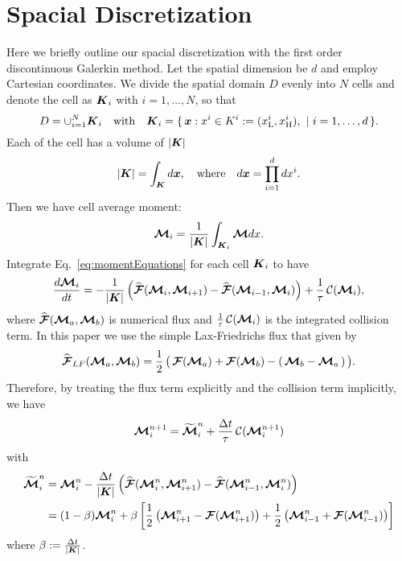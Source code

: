\section{Spacial Discretization}\label{se:SpacialDiscretization}
Here we briefly outline our spacial discretization with the first order discontinuous Galerkin method.
Let the spatial dimension be $d$ and employ Cartesian coordinates.
We divide the spatial domain $D$ evenly into $N$ cells and denote the cell as $\boldsymbol{K}_{i}$ with $i = 1,\ldots,N$, so that
\begin{equation*}
D = \cup_{i = 1}^{N} \boldsymbol{K}_{i} \quad \text{with} \quad
  \boldsymbol{K}_{i}=\{\,\boldsymbol{x} : x^{i} \in K^{i} := (x_{{\rm L}}^{i},x_{{\rm H}}^{i}),~|~i=1,\ldots,d\,\}.
\end{equation*}
Each of the cell has a volume of $|\boldsymbol{K}|$
\begin{equation*}
  |\boldsymbol{K}| = \int_{\boldsymbol{K}}d\boldsymbol{x}, \quad\text{where}\quad d\boldsymbol{x} = \prod_{i=1}^{d}dx^{i}.  
\end{equation*}
Then we have cell average moment:
\begin{equation}
\boldsymbol{\mathcal{M}}_{i} = \dfrac{1}{|\boldsymbol{K}|} \int_{\boldsymbol{K}_i}\boldsymbol{\mathcal{M}} dx.
\end{equation}
Integrate Eq.~\eqref{eq:momentEquations} for each cell $\boldsymbol{K}_{i}$ to have
\begin{equation}
\dfrac{d \boldsymbol{\mathcal{M}}_{i}}{d t} = - \dfrac{1}{|\boldsymbol{K}|} \left( \widehat{\boldsymbol{\mathcal{F}}}(\boldsymbol{\mathcal{M}}_{i},\boldsymbol{\mathcal{M}}_{i+1}) -  \widehat{\boldsymbol{\mathcal{F}}}(\boldsymbol{\mathcal{M}}_{i-1},\boldsymbol{\mathcal{M}}_{i})\right) + \frac{1}{\tau}\,\mathcal{C}(\boldsymbol{\mathcal{M}}_{i}),
\end{equation}
where $\widehat{\boldsymbol{\mathcal{F}}}(\boldsymbol{\mathcal{M}}_{a},\boldsymbol{\mathcal{M}}_{b})$ is numerical flux and $\frac{1}{\tau}\,\mathcal{C}(\boldsymbol{\mathcal{M}}_{i})$ is the integrated collision term.
In this paper we use the simple Lax-Friedrichs flux that given by
\begin{equation}
  \widehat{\boldsymbol{\mathcal{F}}}_{LF}(\boldsymbol{\mathcal{M}}_{a},\boldsymbol{\mathcal{M}}_{b})
  =\frac{1}{2}\,\big(\,\boldsymbol{\mathcal{F}}(\boldsymbol{\mathcal{M}}_{a})+\boldsymbol{\mathcal{F}}(\boldsymbol{\mathcal{M}}_{b})-(\,\boldsymbol{\mathcal{M}}_{b}-\boldsymbol{\mathcal{M}}_{a}\,)\,\big).
  \label{eq:Lax-Friedrichs flux}
\end{equation}
Therefore, by treating the flux term explicitly and the collision term implicitly, we have
\begin{align}
\boldsymbol{\mathcal{M}}_{i}^{n+1} = \widetilde{\boldsymbol{\mathcal{M}}}^{n}_{i} + \frac{\Delta t}{\tau}\,\mathcal{C}(\boldsymbol{\mathcal{M}}^{n+1}_{i})
\label{eq:MomentIMEX}
\end{align}
with
\begin{align}
\widetilde{\boldsymbol{\mathcal{M}}}^{n}_{i} 
& = \boldsymbol{\mathcal{M}}_{i}^{n} - \dfrac{\Delta t}{|\boldsymbol{K}|} \left( \widehat{\boldsymbol{\mathcal{F}}}(\boldsymbol{\mathcal{M}}^{n}_{i},\boldsymbol{\mathcal{M}}^{n}_{i+1}) -  \widehat{\boldsymbol{\mathcal{F}}}(\boldsymbol{\mathcal{M}}^{n}_{i-1},\boldsymbol{\mathcal{M}}^{n}_{i})\right)\nonumber \\
& = (1-\beta)\boldsymbol{\mathcal{M}}_{i}^{n} + \beta\left[ \frac{1}{2}\left( \boldsymbol{\mathcal{M}}^{n}_{i+1}-\boldsymbol{\mathcal{F}}(\boldsymbol{\mathcal{M}}^{n}_{i+1})\right)  + \frac{1}{2}\left( \boldsymbol{\mathcal{M}}^{n}_{i-1}+\boldsymbol{\mathcal{F}}(\boldsymbol{\mathcal{M}}^{n}_{i-1})\right)\right]
\label{eq:widetildeM}
\end{align}
where $\beta := \frac{\Delta t}{|\boldsymbol{K}|}$.

